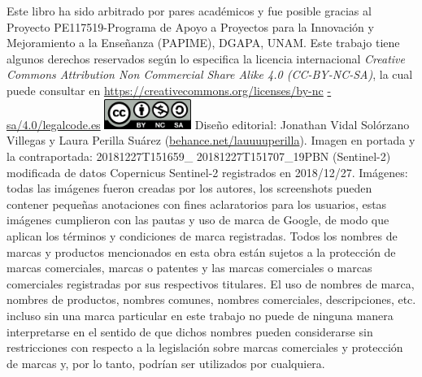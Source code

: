\documentclass[
  12pt,
  letterpaper,
  twoside]{book}
\begin{document}
\setlength{\columnsep}{25pt}
\begin{multicols*}{2}
    \raggedcolumns
    {\scriptsize Este libro ha sido arbitrado por pares académicos y fue posible gracias al Proyecto PE117519-Programa de Apoyo a Proyectos para la Innovación y Mejoramiento a la Enseñanza (PAPIME), DGAPA, UNAM. 
    \linebreak Este trabajo tiene algunos derechos reservados según lo especifica la licencia internacional {\it Creative Commons Attribution Non Commercial Share Alike 4.0 (CC-BY-NC-SA)}, la cual puede consultar en \href{https://creativecommons.org/licenses/by-nc-sa/4.0/legalcode.es}{https://creativecommons.org/licenses/by-nc} \href{https://creativecommons.org/licenses/by-nc -sa/4.0/legalcode.es}{-sa/4.0/legalcode.es}
    \linebreak
    \linebreak
    \begingroup
        \includegraphics[height=28pt]{Img/license}
    \endgroup
    \newline Diseño editorial: Jonathan Vidal Solórzano Villegas y Laura Perilla Suárez (\href{https://behance.net/lauuuuperilla}{behance.net/lauuuuperilla}).
    \newline Imagen en portada y la contraportada: 20181227T151659\_ 20181227T151707\_19PBN (Sentinel-2) modificada de datos Copernicus Sentinel-2 registrados en 2018/12/27. 
    \newline Imágenes: todas las imágenes fueron creadas por los autores, los screenshots pueden contener pequeñas anotaciones con fines aclaratorios para los usuarios, estas imágenes cumplieron con las pautas y uso de marca de Google, de modo que aplican los términos y condiciones de marca registradas. 
    \newline Todos los nombres de marcas y productos mencionados en esta obra están sujetos a la protección de marcas comerciales, marcas o patentes y las marcas comerciales o marcas comerciales registradas por sus respectivos titulares. 
    El uso de nombres de marca, nombres de productos, nombres comunes, nombres comerciales, descripciones, etc. incluso sin una marca particular en este trabajo no puede de ninguna manera interpretarse en el sentido de que dichos nombres pueden considerarse sin restricciones con respecto a la legislación sobre marcas comerciales y protección de marcas y, por lo tanto, podrían ser utilizados por cualquiera.
}
\end{multicols*}
\end{document}
